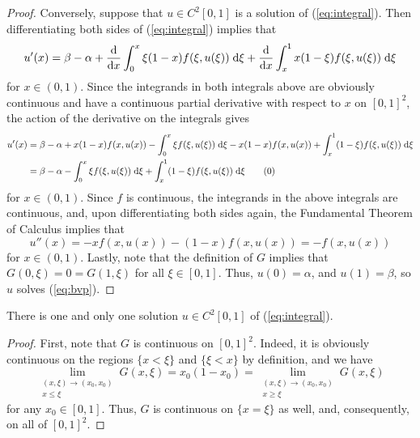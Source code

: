 \documentclass{homework}
\begin{document}
\begin{enumerate}[label=\textbf{(\roman*)}]
\begin{proof}
			Conversely, suppose that $u \in C^2[0,1]$ is a solution of (\ref{eq:integral}). Then differentiating both sides of (\ref{eq:integral}) implies that
			\begin{equation}
				\label{eq:diff_u1}
				u'(x) = \beta - \alpha + \frac{\text{d}}{\text{d} x}\int_0^x \xi(1-x)f(\xi, u(\xi))\;\text{d}\xi + \frac{\text{d}}{\text{d} x}\int_x^1 x(1-\xi)f(\xi,u(\xi))\;\text{d}\xi
			\end{equation}
			for $x \in (0,1)$. Since the integrands in both integrals above are obviously continuous and have a continuous partial derivative with respect to $x$ on $[0,1]^2$, the action of the derivative on the integrals gives
			\begin{align*}
				\label{eq:diff_u2}
				u'(x) &= \beta - \alpha + x(1-x)f(x,u(x)) -\int_0^x\xi f(\xi,u(\xi))\dee\xi - x(1-x)f(x,u(x))+\int_x^1(1-\xi)f(\xi,u(\xi))\dee\xi \\
				&= \beta - \alpha - \int_0^x\xi f(\xi,u(\xi))\dee\xi + \int_x^1(1-\xi)f(\xi,u(\xi))\dee\xi \tag{\arabic{equation}}\stepcounter{equation}
			\end{align*}
			for $x \in(0,1)$. Since $f$ is continuous, the integrands in the above integrals are continuous, and, upon differentiating both sides again, the Fundamental Theorem of Calculus implies that
			\begin{equation}
				\label{eq:diff_u3}
				u''(x) = -xf(x,u(x)) - (1-x)f(x,u(x)) = -f(x,u(x))
			\end{equation}
			for $x \in (0,1)$. Lastly, note that the definition of $G$ implies that $G(0,\xi) = 0 = G(1,\xi)$ for all $\xi \in [0,1]$. Thus, $u(0) = \alpha$, and $u(1) = \beta$, so $u$ solves (\ref{eq:bvp}).
		\end{proof}
		\questionpart There is one and only one solution $u \in C^2[0,1]$ of (\ref{eq:integral}).
		\begin{proof}
			First, note that $G$ is continuous on $[0,1]^2$. Indeed, it is obviously continuous on the regions $\{x < \xi\}$ and $\{\xi < x\}$ by definition, and we have
			\begin{equation}
				\lim_{\substack{(x,\xi)\to(x_0,x_0)\\x \le \xi}} G(x,\xi) = x_0(1-x_0) = \lim_{\substack{(x,\xi)\to (x_0,x_0)\\x \ge \xi}} G(x,\xi)
			\end{equation}
			for any $x_0 \in [0,1]$. Thus, $G$ is continuous on $\{x=\xi\}$ as well, and, consequently, on all of $[0,1]^2$.
			

\end{proof}
\end{enumerate}
\end{document}
